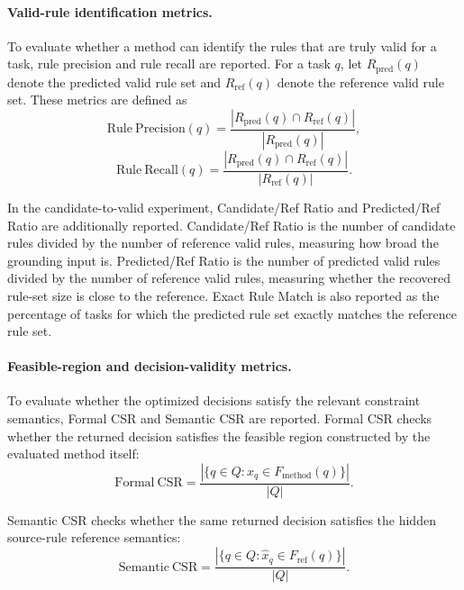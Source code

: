 ﻿\documentclass[a4paper,fleqn]{cas-dc}
\begin{document}
\paragraph{Valid-rule identification metrics.}
To evaluate whether a method can identify the rules that are truly valid for a task, rule precision and rule recall are reported. For a task $q$, let $R_{\mathrm{pred}}(q)$ denote the predicted valid rule set and $R_{\mathrm{ref}}(q)$ denote the reference valid rule set. These metrics are defined as
\begin{equation}
\mathrm{Rule\ Precision}(q)=
\frac{|R_{\mathrm{pred}}(q)\cap R_{\mathrm{ref}}(q)|}
{|R_{\mathrm{pred}}(q)|},
\end{equation}
\begin{equation}
\mathrm{Rule\ Recall}(q)=
\frac{|R_{\mathrm{pred}}(q)\cap R_{\mathrm{ref}}(q)|}
{|R_{\mathrm{ref}}(q)|}.
\end{equation}

In the candidate-to-valid experiment, Candidate/Ref Ratio and Predicted/Ref Ratio are additionally reported. Candidate/Ref Ratio is the number of candidate rules divided by the number of reference valid rules, measuring how broad the grounding input is. Predicted/Ref Ratio is the number of predicted valid rules divided by the number of reference valid rules, measuring whether the recovered rule-set size is close to the reference. Exact Rule Match is also reported as the percentage of tasks for which the predicted rule set exactly matches the reference rule set.

\paragraph{Feasible-region and decision-validity metrics.}
To evaluate whether the optimized decisions satisfy the relevant constraint semantics, Formal CSR and Semantic CSR are reported. Formal CSR checks whether the returned decision satisfies the feasible region constructed by the evaluated method itself:
\begin{equation}
\mathrm{Formal\ CSR}=
\frac{
|\{q\in Q:\hat{x}_q\in F_{\mathrm{method}}(q)\}|
}
{|Q|}.
\end{equation}

Semantic CSR checks whether the same returned decision satisfies the hidden source-rule reference semantics:
\begin{equation}
\mathrm{Semantic\ CSR}=
\frac{
|\{q\in Q:\hat{x}_q\in F_{\mathrm{ref}}(q)\}|
}
{|Q|}.
\end{equation}
\end{document}
